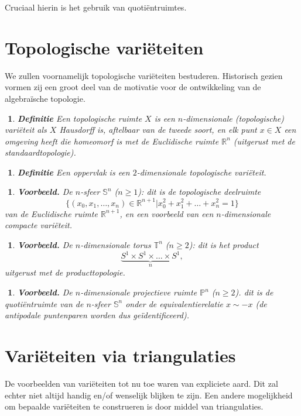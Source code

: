 \documentclass[12pt]{book}
\newcommand{\R}{\mathbb{R}}
\newtheorem{vbh}[stelh]{$\!\!$}
\newenvironment{vb}{\begin{vbh} \em {\bf Voorbeeld.} }{\end{vbh}}
\newtheorem{dfh}[stelh]{$\!\!$}
\newenvironment{df}{\begin{dfh} \em {\bf Definitie }}{\end{dfh}}
\begin{document}
Cruciaal hierin is het gebruik van quoti\"entruimtes. 


\section{Topologische vari\"eteiten}

We zullen voornamelijk topologische vari\"eteiten bestuderen. Historisch gezien vormen zij een groot deel van de motivatie voor de ontwikkeling van de algebra\"ische topologie.


\begin{df} 
Een topologische ruimte $X$ is een \emph{$n$-dimensionale (topologische) vari\"eteit} als $X$ Hausdorff is, aftelbaar van de tweede soort, en elk punt $x \in X$ een omgeving heeft die homeomorf is met de Euclidische ruimte $\R^n$ (uitgerust met de standaardtopologie).
\end{df}

\begin{df} 
Een \emph{oppervlak} is een $2$-dimensionale topologische vari\"eteit.
\end{df}


\begin{vb}
De \emph{$n$-sfeer $\mathbb{S}^n$} ($n \geq 1$): dit is de topologische deelruimte 
$$
\{(x_0, x_1, \dots ,x_n ) \in \R^{n+1} \vert x_0^2 + x_1^2 + \dots + x_n^2 = 1 \} 
$$
van de Euclidische ruimte $\R^{n+1}$, en een voorbeeld van een $n$-dimensionale compacte vari\"eteit.
\end{vb}

\begin{vb}
De \emph{$n$-dimensionale torus $\mathbb{T}^n$} ($n \geq 2$): dit is het product 
$$\underbrace{S^1 \times S^1 \times \dots  \times S^1}_n ,$$
uitgerust met de producttopologie.
\end{vb}


\begin{vb}
De \emph{$n$-dimensionale projectieve ruimte $\mathbb{P}^n$} ($n \geq 2$). dit is de quoti\"entruimte van de $n$-sfeer $\mathbb{S}^n$ onder de equivalentierelatie $x \sim -x$ (de antipodale puntenparen worden dus ge\"identificeerd).  
\end{vb}


%

\section{Vari\"eteiten via triangulaties}
De voorbeelden van vari\"eteiten tot nu toe waren van expliciete aard. Dit zal echter niet altijd handig en/of wenselijk blijken te zijn. Een andere mogelijkheid om  bepaalde vari\"eteiten te construeren is door middel van triangulaties.
\end{document}
